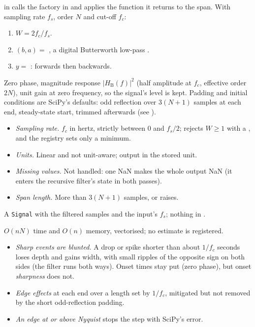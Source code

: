  in  calls the factory
 in  and applies
the function it returns to the span. With sampling rate $f_s$, order $N$ and cut-off $f_c$:
\begin{enumerate}
\item $W = 2f_c/f_s$.
\item $(b, a) =$ , a digital Butterworth
  low-pass \citep{butterworth1930theory,virtanen2020scipy}.
\item $y =$ : forwards then backwards.
\end{enumerate}
Zero phase, magnitude response $|H_\mathrm{B}(f)|^2$ (half amplitude at $f_c$, effective order
$2N$), unit gain at zero frequency, so the signal's level is kept. Padding and initial
conditions are SciPy's defaults: odd reflection over $3(N+1)$ samples at each end, steady-state
start, trimmed afterwards (see ).

\begin{itemize}
\item \emph{Sampling rate.} $f_c$ in hertz, strictly between 0 and $f_s/2$; 
  rejects $W \geq 1$ with a , and the registry sets only a minimum.
\item \emph{Units.} Linear and not unit-aware; output in the stored unit.
\item \emph{Missing values.} Not handled: one NaN makes the whole output NaN (it enters the
  recursive filter's state in both passes). 
\item \emph{Span length.} More than $3(N+1)$ samples, or  raises.
\end{itemize}

A \texttt{Signal} with the filtered samples and the input's $f_s$; nothing in .

$O(nN)$ time and $O(n)$ memory, vectorised; no estimate is registered.

\begin{itemize}
\item \emph{Sharp events are blunted.} A drop or spike shorter than about $1/f_c$ seconds loses
  depth and gains width, with small ripples of the opposite sign on both sides (the filter runs
  both ways). Onset times stay put (zero phase), but onset \emph{sharpness} does not.
\item \emph{Edge effects} at each end over a length set by $1/f_c$, mitigated but not removed by
  the short odd-reflection padding. 
\item \emph{An edge at or above Nyquist} stops the step with SciPy's error.
\end{itemize}

